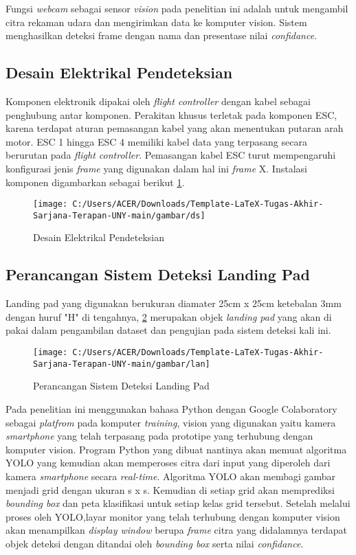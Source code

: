 Fungsi \textit{webcam} sebagai sensor \textit{vision} pada penelitian ini adalah untuk mengambil citra rekaman udara dan mengirimkan data ke komputer vision. Sistem menghasilkan deteksi frame dengan nama dan presentase nilai \textit{confidance}.

\subsection{Desain Elektrikal Pendeteksian}
Komponen elektronik dipakai oleh \textit{flight controller} dengan kabel sebagai penghubung antar komponen. Perakitan khusus terletak pada komponen ESC, karena terdapat aturan pemasangan kabel yang akan menentukan putaran arah motor. ESC 1 hingga ESC 4 memiliki kabel data yang terpasang secara berurutan pada \textit{flight controller}. Pemasangan kabel ESC turut mempengaruhi konfigurasi jenis \textit{frame} yang digunakan dalam hal ini \textit{frame} X. Instalasi komponen digambarkan sebagai berikut \cref{fig:ds}.

\begin{figure}[H]
	\centering
	\texttt{[image: C:/Users/ACER/Downloads/Template-LaTeX-Tugas-Akhir-Sarjana-Terapan-UNY-main/gambar/ds]}
	\caption{Desain Elektrikal Pendeteksian}
	\label{fig:ds}
\end{figure}


\subsection{Perancangan Sistem Deteksi Landing Pad}
Landing pad yang digunakan berukuran diamater 25cm x 25cm ketebalan 3mm dengan huruf "H" di tengahnya, \cref{fig:lan} merupakan objek \textit{landing pad} yang akan di pakai dalam pengambilan dataset dan pengujian pada sistem deteksi kali ini.

\begin{figure}[H]
	\centering
	\texttt{[image: C:/Users/ACER/Downloads/Template-LaTeX-Tugas-Akhir-Sarjana-Terapan-UNY-main/gambar/lan]}
	\caption{Perancangan Sistem Deteksi Landing Pad}
	\label{fig:lan}
\end{figure}

Pada penelitian ini menggunakan bahasa Python dengan Google Colaboratory sebagai \textit{platfrom} pada komputer \textit{training}, vision yang digunakan yaitu kamera \textit{smartphone} yang telah terpasang pada prototipe yang terhubung dengan komputer vision. Program Python yang dibuat nantinya akan memuat algoritma YOLO yang kemudian akan memperoses citra dari input yang diperoleh dari kamera \textit{smartphone} secara \textit{real-time}. Algoritma YOLO akan membagi gambar menjadi grid dengan ukuran s x s. Kemudian di setiap grid akan memprediksi \textit{bounding box} dan peta klasifikasi untuk setiap kelas grid tersebut\cite{nazilly2020implementasi}. Setelah melalui proses oleh YOLO,layar monitor yang telah terhubung dengan komputer vision akan menampilkan \textit{display window} berupa \textit{frame} citra yang didalamnya terdapat objek deteksi dengan ditandai oleh \textit{bounding box} serta nilai \textit{confidance}.

